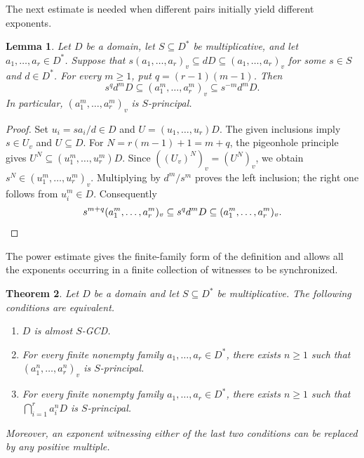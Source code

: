 \documentclass[11pt]{amsart}
\newtheorem{theorem}{Theorem}[section]
\newtheorem{lemma}[theorem]{Lemma}
\theoremstyle{definition}
\theoremstyle{remark}
\begin{document}
The next estimate is needed when different pairs initially yield
different exponents.

\begin{lemma}\label{l:power-sandwich}
Let $D$ be a domain, let $S\subseteq D^\ast$ be multiplicative, and let
$a_1,\ldots,a_r\in D^\ast$. Suppose that
$s(a_1,\ldots,a_r)_v\subseteq dD\subseteq(a_1,\ldots,a_r)_v$
for some $s\in S$ and $d\in D^\ast$. For every $m\geq1$, put
$q=(r-1)(m-1)$. Then
\[
s^q d^mD\subseteq(a_1^m,\ldots,a_r^m)_v
\subseteq s^{-m}d^mD.
\]
In particular, $(a_1^m,\ldots,a_r^m)_v$ is $S$-principal.
\end{lemma}

\begin{proof}
Set $u_i=sa_i/d\in D$ and $U=(u_1,\ldots,u_r)D$.
The given inclusions imply $s\in U_v$ and $U\subseteq D$.
For $N=r(m-1)+1=m+q$, the pigeonhole principle gives
$U^N\subseteq(u_1^m,\ldots,u_r^m)D$. Since
$((U_v)^N)_v=(U^N)_v$, we obtain
$s^N\in(u_1^m,\ldots,u_r^m)_v$.
Multiplying by $d^m/s^m$ proves the left inclusion; the right one follows
from $u_i^m\in D$. Consequently
\[
s^{m+q}(a_1^m,\ldots,a_r^m)_v
\subseteq s^q d^mD\subseteq(a_1^m,\ldots,a_r^m)_v.
\qedhere
\]
\end{proof}

The power estimate gives the finite-family form of the definition and
allows all the exponents occurring in a finite collection of witnesses
to be synchronized.

\begin{theorem}\label{t:finite-families}
Let $D$ be a domain and let $S\subseteq D^\ast$ be multiplicative.
The following conditions are equivalent.
\begin{enumerate}
\item $D$ is almost $S$-GCD.
\item For every finite nonempty family $a_1,\ldots,a_r\in D^\ast$,
there exists $n\geq1$ such that $(a_1^n,\ldots,a_r^n)_v$ is
$S$-principal.
\item For every finite nonempty family $a_1,\ldots,a_r\in D^\ast$,
there exists $n\geq1$ such that $\bigcap_{i=1}^r a_i^nD$ is
$S$-principal.
\end{enumerate}
Moreover, an exponent witnessing either of the last two conditions
can be replaced by any positive multiple.
\end{theorem}
\end{document}

